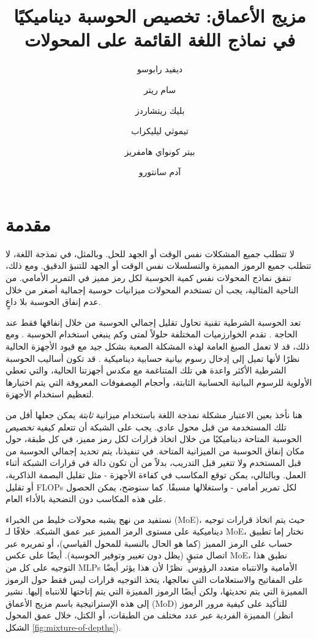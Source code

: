 \documentclass[11pt, a4paper, onecolumn, logo, copyright]{googledeepmind}
\title{مزيج الأعماق: تخصيص الحوسبة ديناميكيًا في نماذج اللغة القائمة على المحولات}
\author[1*]{ديفيد رابوسو}
\author[1]{سام ريتر}
\author[1,2]{بليك ريتشاردز}
\author[1]{تيموثي ليليكراب}
\author[1]{بيتر كونواي هامفريز}
\author[1*]{آدم سانتورو}
\affil[1]{جوجل ديب مايند}
\affil[2]{جامعة ماكجيل ومعهد ميلا}
\affil[*]{مساهمة متساوية}
\begin{document}
\maketitle

\section{مقدمة}
لا تتطلب جميع المشكلات نفس الوقت أو الجهد للحل. وبالمثل، في نمذجة اللغة، لا تتطلب جميع الرموز المميزة والتسلسلات نفس الوقت أو الجهد للتنبؤ الدقيق. ومع ذلك، تنفق نماذج المحولات نفس كمية الحوسبة لكل رمز مميز في التمرير الأمامي. من الناحية المثالية، يجب أن تستخدم المحولات ميزانيات حوسبة إجمالية أصغر من خلال عدم إنفاق الحوسبة بلا داعٍ.

تعد الحوسبة الشرطية تقنية تحاول تقليل إجمالي الحوسبة من خلال إنفاقها فقط عند الحاجة \citep{bengio2013deep,bengio2013estimating,bengio2016conditional}. تقدم الخوارزميات المختلفة حلولاً لمتى وكم ينبغي استخدام الحوسبة \citep{ainslie2023colt5, fedus2022switch, bapna_controlling}. ومع ذلك، قد لا تعمل الصيغ العامة لهذه المشكلة الصعبة بشكل جيد مع قيود الأجهزة الحالية نظرًا لأنها تميل إلى إدخال رسوم بيانية حسابية ديناميكية \citep{graves_adaptive, dehghani2018universal}. قد تكون أساليب الحوسبة الشرطية الأكثر واعدة هي تلك المتناغمة مع مكدس أجهزتنا الحالية، والتي تعطي الأولوية للرسوم البيانية الحسابية الثابتة، وأحجام المِصفوفات المعروفة التي يتم اختيارها لتعظيم استخدام الأجهزة.

هنا نأخذ بعين الاعتبار مشكلة نمذجة اللغة باستخدام ميزانية \textit{ثابتة} يمكن جعلها أقل من تلك المستخدمة من قبل محول عادي. يجب على الشبكة أن تتعلم كيفية \textit{تخصيص} الحوسبة المتاحة ديناميكيًا من خلال اتخاذ قرارات لكل رمز مميز، في كل طبقة، حول مكان إنفاق الحوسبة من الميزانية المتاحة. في تنفيذنا، يتم تحديد إجمالي الحوسبة من قبل المستخدم ولا تتغير قبل التدريب، بدلاً من أن تكون دالة في قرارات الشبكة أثناء العمل. وبالتالي، يمكن توقع المكاسب في كفاءة الأجهزة - مثل تقليل البصمة الذاكرية، أو تقليل FLOPs لكل تمرير أمامي - واستغلالها مسبقًا. كما سنوضح، يمكن الحصول على هذه المكاسب دون التضحية بالأداء العام.

نستفيد من نهج يشبه محولات خليط من الخبراء (MoE)، حيث يتم اتخاذ قرارات توجيه ديناميكية على مستوى الرمز المميز عبر عمق الشبكة. خلافًا لـ MoE، نختار إما تطبيق حساب على الرمز المميز (كما هو الحال بالنسبة للمحول القياسي)، أو تمريره عبر اتصال متبقٍ (يظل دون تغيير وتوفير الحوسبة). أيضًا على عكس MoE، نطبق هذا التوجيه على كل من MLPs الأمامية والانتباه متعدد الرؤوس. نظرًا لأن هذا يؤثر أيضًا على المفاتيح والاستعلامات التي نعالجها، يتخذ التوجيه قرارات ليس فقط حول الرموز المميزة التي يتم تحديثها، ولكن أيضًا الرموز المميزة التي يتم إتاحتها للانتباه إليها. نشير إلى هذه الإستراتيجية باسم مزيج الأعماق (MoD) للتأكيد على كيفية مرور الرموز المميزة الفردية عبر عدد مختلف من الطبقات، أو الكتل، خلال عمق المحول (انظر الشكل \ref{fig:mixture-of-depths}).
\end{document}
